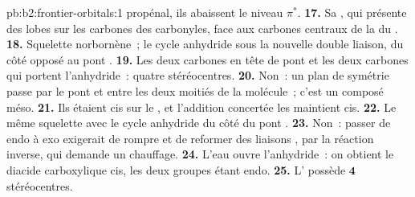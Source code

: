 \begin{solution}{pb:b2:frontier-orbitals:1}
propénal, ils abaissent le niveau $\pi^*$.
\textbf{17.} Sa , qui présente des lobes sur les carbones des carbonyles, face aux carbones centraux de
la  du .
\textbf{18.} Squelette norbornène~; le cycle anhydride sous la nouvelle double liaison, du côté opposé au
pont .
\textbf{19.} Les deux carbones en tête de pont et les deux carbones qui portent l'anhydride~: quatre
stéréocentres.
\textbf{20.} Non~: un plan de symétrie passe par le pont  et entre les deux moitiés
de la molécule~; c'est un composé méso.
\textbf{21.} Ils étaient cis sur le , et l'addition concertée les maintient cis.
\textbf{22.} Le même squelette avec le cycle anhydride du côté du pont .
\textbf{23.} Non~: passer de endo à exo exigerait de rompre et de reformer des liaisons , par
la réaction inverse, qui demande un chauffage.
\textbf{24.} L'eau ouvre l'anhydride~: on obtient le diacide carboxylique cis, les deux groupes  étant endo.
\textbf{25.} L' possède $\boldsymbol{4}$ stéréocentres.
\end{solution}
